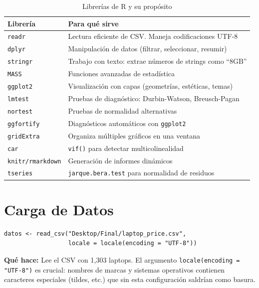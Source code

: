 \documentclass[12pt,a4paper]{article}
\begin{document}
\begin{table}[H]
\centering
\caption{Librerías de R y su propósito}
\begin{tabular}{lp{9cm}}
\toprule
\textbf{Librería} & \textbf{Para qué sirve} \\
\midrule
\texttt{readr} & Lectura eficiente de CSV. Maneja codificaciones UTF-8 \\
\texttt{dplyr} & Manipulación de datos (filtrar, seleccionar, resumir) \\
\texttt{stringr} & Trabajo con texto: extrae números de strings como ``8GB'' \\
\texttt{MASS} & Funciones avanzadas de estadística \\
\texttt{ggplot2} & Visualización con capas (geometrías, estéticas, temas) \\
\texttt{lmtest} & Pruebas de diagnóstico: Durbin-Watson, Breusch-Pagan \\
\texttt{nortest} & Pruebas de normalidad alternativas \\
\texttt{ggfortify} & Diagnósticos automáticos con \texttt{ggplot2} \\
\texttt{gridExtra} & Organiza múltiples gráficos en una ventana \\
\texttt{car} & \texttt{vif()} para detectar multicolinealidad \\
\texttt{knitr/rmarkdown} & Generación de informes dinámicos \\
\texttt{tseries} & \texttt{jarque.bera.test} para normalidad de residuos \\
\bottomrule
\end{tabular}
\end{table}

\section{Carga de Datos}

\begin{lstlisting}[caption={Lectura del dataset}]
datos <- read_csv("Desktop/Final/laptop_price.csv",
                  locale = locale(encoding = "UTF-8"))
\end{lstlisting}

\textbf{Qué hace:} Lee el CSV con 1,303 laptops. El argumento \texttt{locale(encoding = "UTF-8")} es crucial: nombres de marcas y sistemas operativos contienen caracteres especiales (tildes, etc.) que sin esta configuración saldrían como basura.
\end{document}
